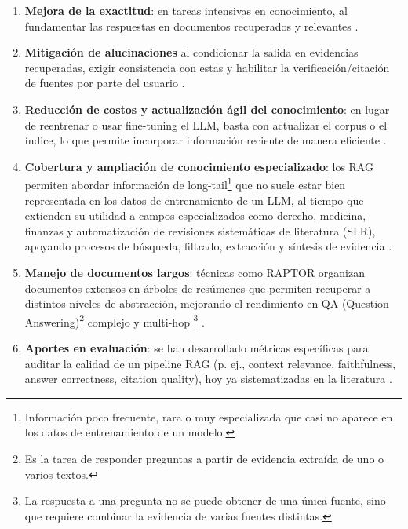 \begin{enumerate}
    \item \textbf{Mejora de la exactitud}: en tareas intensivas en conocimiento, al fundamentar las respuestas en documentos recuperados y relevantes \parencite{gao2023rag,zhao2024rag}.
    \item \textbf{Mitigación de alucinaciones} al condicionar la salida en evidencias recuperadas, exigir consistencia con estas y habilitar la verificación/citación de fuentes por parte del usuario \parencite{zhang2025hallucination,fan2024ragllm}.
    \item \textbf{Reducción de costos y actualización ágil del conocimiento}: en lugar de reentrenar o usar fine-tuning el LLM, basta con actualizar el corpus o el índice, lo que permite incorporar información reciente de manera eficiente \parencite{gao2023rag,zhai2024llmIR}.
    \item \textbf{Cobertura y ampliación de conocimiento especializado}: los RAG permiten abordar información de long-tail\footnote{Información poco frecuente, rara o muy especializada que casi no aparece en los datos de entrenamiento de un modelo.} que no suele estar bien representada en los datos de entrenamiento de un LLM, al tiempo que extienden su utilidad a campos especializados como derecho, medicina, finanzas y automatización de revisiones sistemáticas de literatura (SLR), apoyando procesos de búsqueda, filtrado, extracción y síntesis de evidencia \parencite{gao2023rag,hu2024ragrau,zhai2024llmIR}.
    \item \textbf{Manejo de documentos largos}: técnicas como RAPTOR organizan documentos extensos en árboles de resúmenes que permiten recuperar a distintos niveles de abstracción, mejorando el rendimiento en QA (Question Answering)\footnote{Es la tarea de responder preguntas a partir de evidencia extraída de uno o varios textos. }
    complejo y multi-hop \footnote{La respuesta a una pregunta no se puede obtener de una única fuente, sino que requiere combinar la evidencia de varias fuentes distintas.} \parencite{sarthi2024raptor}.
    \item \textbf{Aportes en evaluación}: se han desarrollado métricas específicas para auditar la calidad de un pipeline RAG (p. ej., context relevance, faithfulness, answer correctness, citation quality), hoy ya sistematizadas en la literatura \parencite{knollmeyer2024benchmarking}.
\end{enumerate}

